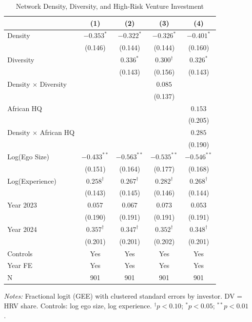 
\begin{table}[htbp]
\centering
\caption{Network Density, Diversity, and High-Risk Venture Investment}
\label{tab:pooled}
\small
\begin{tabular}{lcccc}
\toprule
 & (1) & (2) & (3) & (4) \\
\midrule
Density & $-0.353^{*}$ & $-0.322^{*}$ & $-0.326^{*}$ & $-0.401^{*}$ \\
 & (0.146) & (0.144) & (0.144) & (0.160) \\
Diversity & & $0.336^{*}$ & $0.300^{\dagger}$ & $0.326^{*}$ \\
 & & (0.143) & (0.156) & (0.143) \\
Density $\times$ Diversity & & & $0.085$ & \\
 & & & (0.137) & \\
African HQ & & & & $0.153$ \\
 & & & & (0.205) \\
Density $\times$ African HQ & & & & $0.285$ \\
 & & & & (0.190) \\
Log(Ego Size) & $-0.433^{**}$ & $-0.563^{**}$ & $-0.535^{**}$ & $-0.546^{**}$ \\
 & (0.151) & (0.164) & (0.177) & (0.168) \\
Log(Experience) & $0.258^{\dagger}$ & $0.267^{\dagger}$ & $0.282^{\dagger}$ & $0.268^{\dagger}$ \\
 & (0.143) & (0.145) & (0.146) & (0.144) \\
Year 2023 & $0.057$ & $0.067$ & $0.073$ & $0.053$ \\
 & (0.190) & (0.191) & (0.191) & (0.191) \\
Year 2024 & $0.357^{\dagger}$ & $0.347^{\dagger}$ & $0.352^{\dagger}$ & $0.348^{\dagger}$ \\
 & (0.201) & (0.201) & (0.202) & (0.201) \\

\midrule
Controls & Yes & Yes & Yes & Yes \\
Year FE & Yes & Yes & Yes & Yes \\
N & 901 & 901 & 901 & 901 \\
\bottomrule
\end{tabular}
\begin{tablenotes}
\small
\item \textit{Notes:} Fractional logit (GEE) with clustered standard errors by investor.
DV = HRV share. Controls: log ego size, log experience.
$^{\dagger}p<0.10$; $^{*}p<0.05$; $^{**}p<0.01$.
\end{tablenotes}
\end{table}
